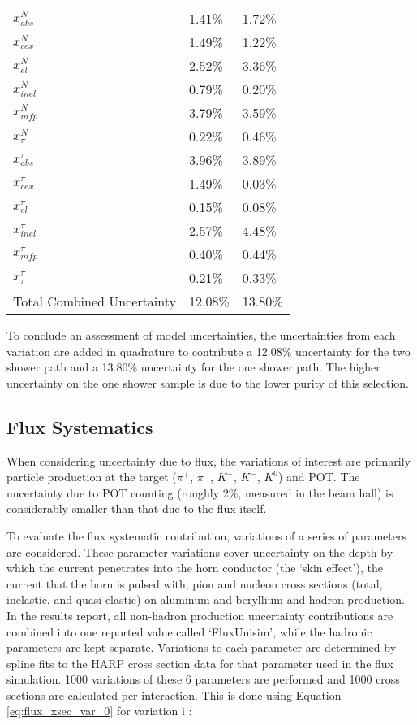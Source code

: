 \begin{table*}
\begin{tabular}{| l | l | l |}
$x_{abs}^{N}$ & 1.41\% & 1.72\% \\
$x_{cex}^{N}$ & 1.49\% & 1.22\%\\
$x_{el}^{N}$ & 2.52\% & 3.36\% \\
$x_{inel}^{N}$ & 0.79\% & 0.20\% \\
$x_{mfp}^{N}$ & 3.79\% & 3.59\% \\
$x_{\pi}^{N}$ & 0.22\% & 0.46\% \\
$x_{abs}^{\pi}$ & 3.96\% & 3.89\% \\
$x_{cex}^{\pi}$ & 1.49\% & 0.03\% \\
$x_{el}^{\pi}$ & 0.15\% & 0.08\% \\
$x_{inel}^{\pi}$ & 2.57\% & 4.48\% \\
$x_{mfp}^{\pi}$ & 0.40\% & 0.44\% \\
$x_{\pi}^{\pi}$ & 0.21\% & 0.33\% \\
\hline
Total Combined Uncertainty & 12.08\% & 13.80\% \\ \hline
\end{tabular}
\end{table*}


To conclude an assessment of model uncertainties, the uncertainties from each variation are added in quadrature to contribute a 12.08\% uncertainty for the two shower path and a 13.80\% uncertainty for the one shower path.  The higher uncertainty on the one shower sample is due to the lower purity of this selection.

\clearpage
\subsection{Flux Systematics}
When considering uncertainty due to flux, the variations of interest are primarily particle production at the target ($\pi^+$, $\pi^-$, $K^+$, $K^-$, $K^0$) and POT.  The uncertainty due to POT counting (roughly 2\%, measured in the beam hall) is considerably smaller than that due to the flux itself. 
\par To evaluate the flux systematic contribution, variations of a series of parameters are considered.  These parameter variations cover uncertainty on the depth by which the current penetrates into the horn conductor (the ‘skin effect’), the current that the horn is pulsed with, pion and nucleon cross sections (total, inelastic, and quasi-elastic) on aluminum and beryllium and hadron production. In the results report, all non-hadron production uncertainty contributions are combined into one reported value called `FluxUnisim', while the hadronic parameters are kept separate.  Variations to each parameter are determined by spline fits to the HARP cross section data for that parameter used in the flux simulation. 1000 variations of these 6 parameters are performed and 1000 cross sections are calculated per interaction.  This is done using Equation \ref{eq:flux_xsec_var_0} for variation i :

